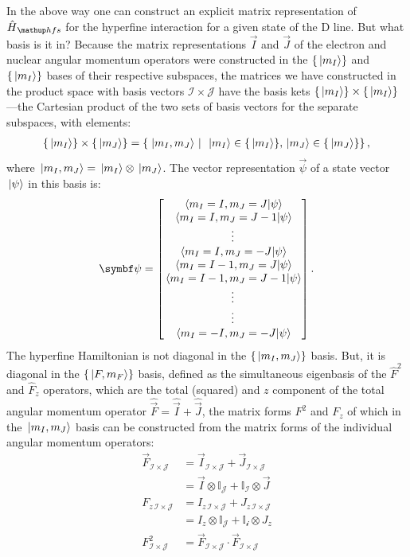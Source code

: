 In the above way one can construct an explicit matrix representation of $\hat H_\up{hfs}$ for the hyperfine interaction for a given state of the D line. But what basis is it in? Because the matrix representations $\vec I$ and $\vec J$ of the electron and nuclear angular momentum operators were constructed in the $\{\ket{m_I}\}$ and $\{\ket{m_I}\}$ bases of their respective subspaces, the matrices we have constructed in the product space with basis vectors $\mathcal{I}\times\mathcal{J}$ have the basis kets $\{\ket{m_I}\} \times \{\ket{m_I}\}$---the Cartesian product of the two sets of basis vectors for the separate subspaces, with elements:
\begin{align}
\{\ket{m_I}\} \times \{\ket{m_J}\} = \left\{\left. \ket{m_I, m_J} \ \right| \ \ket{m_I} \in \{\ket{m_I}\}, \ket{m_J} \in \{\ket{m_J}\}\right\},
\end{align}
where $\ket{m_I, m_J} = \ket{m_I} \otimes \ket{m_J}$. The vector representation $\vec\psi$ of a state vector $\ket{\psi}$ in this basis is:
\begin{align}
\vec \psi = \left[\begin{matrix}
\braket{m_I=I, m_J=J}{\psi}\\
\braket{m_I=I, m_J=J-1}{\psi}\\
\vdots\\
\braket{m_I=I, m_J=-J}{\psi}\\
\braket{m_I=I-1, m_J=J}{\psi}\\
\braket{m_I=I-1, m_J=J-1}{\psi}\\
\vdots\\
\vdots\\
\braket{m_I=-I, m_J=-J}{\psi}\\
\end{matrix}\right].
\end{align}
The hyperfine Hamiltonian is not diagonal in the $\{\ket{m_I, m_J}\}$ basis. But, it is diagonal in the $\{\ket{F, m_F}\}$ basis, defined as the simultaneous eigenbasis of the $\hat F^2$ and $\hat F_z$ operators, which are the total (squared) and $z$ component of the total angular momentum operator $\hat{\vec{F}} = \hat{\vec{I}} + \hat{\vec{J}}$, the matrix forms $F^2$ and $F_z$ of which in the $\ket{m_I, m_J}$ basis can be constructed from the matrix forms of the individual angular momentum operators:
\begin{align}
\vec F_{\mathcal{I}\times\mathcal{J}} &= \vec I_{\mathcal{I}\times\mathcal{J}} + \vec J_{\mathcal{I}\times\mathcal{J}}\nonumber\\
& = \vec I \otimes \mathbb{I}_{\mathcal{J}} + \mathbb{I}_{\mathcal{I}} \otimes \vec J\\
F_{z\,\mathcal{I}\times\mathcal{J}} &= I_{z\,\mathcal{I}\times\mathcal{J}} + J_{z\,\mathcal{I}\times\mathcal{J}}\nonumber\\
& = I_z \otimes \mathbb{I}_{\mathcal{J}} + \mathbb{I}_{\mathcal{i}} \otimes J_z\\
F^2_{\mathcal{I}\times\mathcal{J}} &= \vec F_{\mathcal{I}\times\mathcal{J}}\cdot\vec F_{\mathcal{I}\times\mathcal{J}}
\end{align}

